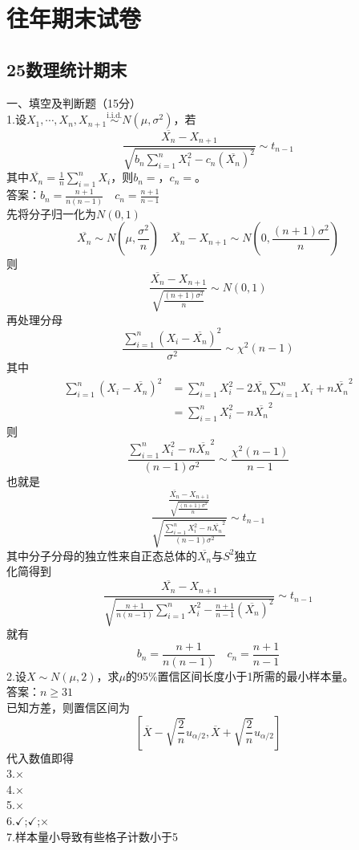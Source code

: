 \documentclass[UTF8,openany]{book}
\begin{document}
	\chapter{\centering 往年期末试卷}
	\section{\centering 25数理统计期末}
	\noindent 一、填空及判断题（15分）\\
	1.设$X_1, \cdots, X_n, X_{n+1} \stackrel{\text{i.i.d.}}{\sim} N(\mu, \sigma^2)$，若
	\[
	\frac{\overline{X_n}-X_{n+1}}{\sqrt{b_n \sum_{i=1}^n X_i^2 - c_n (\overline{X_n})^2}} \sim t_{n-1}
	\]
	其中$\overline{X_n}=\frac{1}{n}\sum_{i=1}^n X_i$，则$b_n=$\underline{\hspace{2cm}}，$c_n=$\underline{\hspace{2cm}}。\\
	答案：$b_n=\frac{n+1}{n(n-1)} \quad c_n=\frac{n+1}{n-1}$\\
	先将分子归一化为$N(0,1)$
	\[
	\overline{X_n}\sim N\left( \mu,\frac{\sigma^2}{n}\right)  \quad \overline{X_n}-X_{n+1}\sim N\left( 0,\frac{(n+1)\sigma^2}{n}\right) 
	\]
	则
	\[
	\frac{\overline{X_n}-X_{n+1}}{\sqrt{\frac{(n+1)\sigma^2}{n}}} \sim N(0,1)
	\]
	再处理分母
	\[
	\frac{\sum\limits_{i=1}^{n} \left( X_i-\overline{X_n}\right)^2}{\sigma^2}\sim \chi^2(n-1)
	\]
	其中
	\begin{align*}
		\sum\limits_{i=1}^{n} \left( X_i-\overline{X_n}\right)^2 &=\sum\limits_{i=1}^{n}X_i^2-2\overline{X_n}\sum\limits_{i=1}^{n}X_i+n\overline{X_n}^2  \\
		& =\sum\limits_{i=1}^{n}X_i^2-n\overline{X_n}^2
	\end{align*}
	则
	\[
	\frac{\sum\limits_{i=1}^{n}X_i^2-n\overline{X_n}^2}{(n-1)\sigma^2}\sim \frac{\chi^2(n-1)}{n-1}
	\]
	也就是
	\[
	\frac{\frac{\overline{X_n}-X_{n+1}}{\sqrt{\frac{(n+1)\sigma^2}{n}}}}{\sqrt{\frac{\sum\limits_{i=1}^{n}X_i^2-n\overline{X_n}^2}{(n-1)\sigma^2}}}\sim t_{n-1}
	\]
	其中分子分母的独立性来自正态总体的$\overline{X_n}$与$S^2$独立\\
	化简得到
	\[
	\frac{\overline{X_n}-X_{n+1}}{\sqrt{\frac{n+1}{n(n-1)} \sum_{i=1}^n X_i^2 - \frac{n+1}{n-1} (\overline{X_n})^2}}\sim t_{n-1}
	\]
	就有
	\[
	b_n=\frac{n+1}{n(n-1)} \quad c_n=\frac{n+1}{n-1}
	\]
	2.设$X \sim N(\mu, 2)$，求$\mu$的95\%置信区间长度小于1所需的最小样本量\underline{\hspace{2cm}}。\\
	答案：$n \geq 31$\\
	已知方差，则置信区间为
	\[
	\left[\overline{X}-\sqrt{\frac{2}{n}}u_{\alpha/2},\overline{X}+\sqrt{\frac{2}{n}}u_{\alpha/2} \right] 
	\]
	代入数值即得\\
	3.$\times$\\
	4.$\times$\\
	5.$\times$\\
	6.$\checkmark$;$\checkmark$;$\times$\\
	7.样本量小导致有些格子计数小于5\\
	
\end{document}
